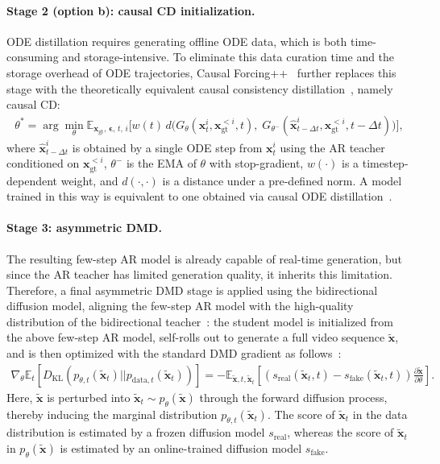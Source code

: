 \documentclass{llmxive}
\providecommand{\bm}[1]{\boldsymbol{#1}}
\providecommand{\E}{\mathbb{E}}
\providecommand{\KL}{D_{\mathrm{KL}}}
\providecommand{\vepsilon}{{\bm{\epsilon}}}
\providecommand{\vx}{{\bm{x}}}
\begin{document}
\paragraph{Stage 2 (option b): causal CD initialization.} ODE distillation requires generating offline ODE data, which is both time-consuming and storage-intensive. To eliminate this data curation time and the storage overhead of ODE trajectories, Causal Forcing++~\cite{zhao2026causal} further replaces this stage with the theoretically equivalent causal consistency distillation~\cite{song2023consistency}, namely causal CD:
\begin{align}
\label{eq:causal-cd}
\theta^*=\arg\min_\theta \mathbb{E}_{\vx_\text{gt},\,\vepsilon,\,t,\,i}\Big[w(t)\,d\big(G_\theta(\vx_t^i,\vx_\text{gt}^{<i}, t),\; G_{\theta^-}(\hat{\vx}^i_{t-\Delta t},\vx_\text{gt}^{<i}, t-\Delta t)\big)\Big],
\end{align}
where $\hat{\vx}^i_{t-\Delta t}$ is obtained by a single ODE step from $\vx_t^i$ using the AR teacher conditioned on $\vx_\text{gt}^{<i}$, $\theta^-$ is the EMA of $\theta$ with stop-gradient, $w(\cdot)$ is a timestep-dependent weight, and $d(\cdot,\cdot)$ is a distance under a pre-defined norm. A model trained in this way is equivalent to one obtained via causal ODE distillation~\cite{zhu2026causal}.

\paragraph{Stage 3: asymmetric DMD.} The resulting few-step AR model is already capable of real-time generation, but since the AR teacher has limited generation quality, it inherits this limitation. Therefore, a final asymmetric DMD stage is applied using the bidirectional diffusion model, aligning the few-step AR model with the high-quality distribution of the bidirectional teacher~\cite{yin2025slow,huang2025self}: the student model is initialized from the above few-step AR model, self-rolls out to generate a full video sequence $\tilde{\vx}$, and is then optimized with the standard DMD gradient as follows~\cite{wang2023prolificdreamer,yin2024one}:
\begin{align}
\label{eq:dmd}
\nabla_\theta\E_t[\KL(p_{\theta,t}(\tilde{\vx}_t)||p_{\text{data},t}(\tilde{\vx}_t))]
   = -\E_{\tilde{\vx}, t, \tilde{\vx}_t}[(s_\text{real}(\tilde{\vx}_t,t)-s_\text{fake}(\tilde{\vx}_t,t))\frac{\partial \tilde{\vx}}{\partial \theta}].
\end{align}
Here, $\tilde{\vx}$ is perturbed into $\tilde{\vx}_t\sim  p_\theta(\tilde{\vx})$ through the forward diffusion process, thereby inducing the marginal distribution $p_{\theta,t}(\tilde{\vx}_t)$. The score of $\tilde{\vx}_t$ in the data distribution is estimated by a frozen diffusion model $s_{\text{real}}$, whereas the score of $\tilde{\vx}_t$ in $p_\theta(\tilde{\vx})$ is estimated by an online-trained diffusion model $s_{\text{fake}}$.
\end{document}
